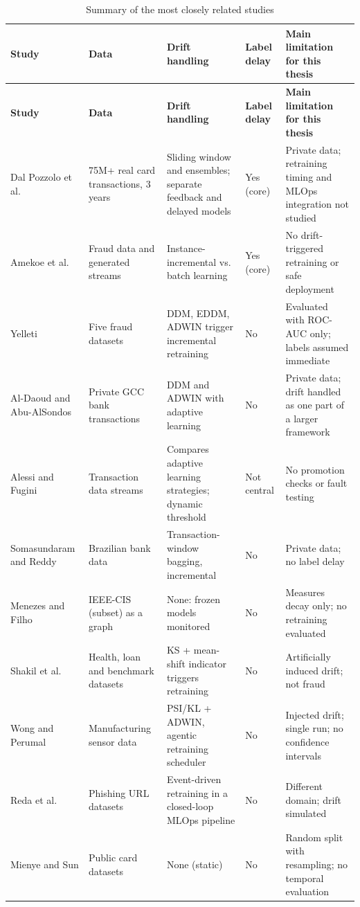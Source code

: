 {\footnotesize
\begin{longtable}{>{\raggedright\arraybackslash}p{}>{\raggedright\arraybackslash}p{}>{\raggedright\arraybackslash}p{}>{\raggedright\arraybackslash}p{}>{\raggedright\arraybackslash}p{}}
\caption{Summary of the most closely related studies}\label{tab:review}\\
\toprule
\textbf{Study} & \textbf{Data} & \textbf{Drift handling} & \textbf{Label delay} & \textbf{Main limitation for this thesis} \\
\midrule
\endfirsthead
\toprule
\textbf{Study} & \textbf{Data} & \textbf{Drift handling} & \textbf{Label delay} & \textbf{Main limitation for this thesis} \\
\midrule
\endhead
Dal Pozzolo et al. \cite{dalpozzolo2018} & 75M+ real card transactions, 3 years & Sliding window and ensembles; separate feedback and delayed models & Yes (core) & Private data; retraining timing and MLOps integration not studied \\ \midrule
Amekoe et al. \cite{amekoe2024} & Fraud data and generated streams & Instance-incremental vs. batch learning & Yes (core) & No drift-triggered retraining or safe deployment \\ \midrule
Yelleti \cite{yelleti2025} & Five fraud datasets & DDM, EDDM, ADWIN trigger incremental retraining & No & Evaluated with ROC-AUC only; labels assumed immediate \\ \midrule
Al-Daoud and Abu-AlSondos \cite{aldaoud2025} & Private GCC bank transactions & DDM and ADWIN with adaptive learning & No & Private data; drift handled as one part of a larger framework \\ \midrule
Alessi and Fugini \cite{alessi2026} & Transaction data streams & Compares adaptive learning strategies; dynamic threshold & Not central & No promotion checks or fault testing \\ \midrule
Somasundaram and Reddy \cite{somasundaram2019} & Brazilian bank data & Transaction-window bagging, incremental & No & Private data; no label delay \\ \midrule
Menezes and Filho \cite{menezes2025} & IEEE-CIS (subset) as a graph & None: frozen models monitored & No & Measures decay only; no retraining evaluated \\ \midrule
Shakil et al. \cite{shakil2025} & Health, loan and benchmark datasets & KS + mean-shift indicator triggers retraining & No & Artificially induced drift; not fraud \\ \midrule
Wong and Perumal \cite{wong2025} & Manufacturing sensor data & PSI/KL + ADWIN, agentic retraining scheduler & No & Injected drift; single run; no confidence intervals \\ \midrule
Reda et al. \cite{reda2025} & Phishing URL datasets & Event-driven retraining in a closed-loop MLOps pipeline & No & Different domain; drift simulated \\ \midrule
Mienye and Sun \cite{mienye2023} & Public card datasets & None (static) & No & Random split with resampling; no temporal evaluation \\ \bottomrule
\end{longtable}
}

